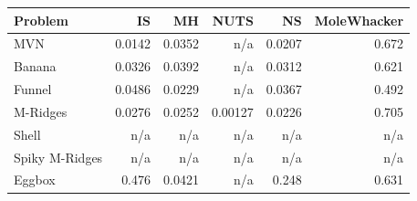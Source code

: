 \begin{tabular}{lrrrrr}
\toprule
Problem & IS & MH & NUTS & NS & MoleWhacker \\
\midrule
MVN & 0.0142 & 0.0352 & n/a & 0.0207 & 0.672 \\
Banana & 0.0326 & 0.0392 & n/a & 0.0312 & 0.621 \\
Funnel & 0.0486 & 0.0229 & n/a & 0.0367 & 0.492 \\
M-Ridges & 0.0276 & 0.0252 & 0.00127 & 0.0226 & 0.705 \\
Shell & n/a & n/a & n/a & n/a & n/a \\
Spiky M-Ridges & n/a & n/a & n/a & n/a & n/a \\
\midrule
Eggbox & 0.476 & 0.0421 & n/a & 0.248 & 0.631 \\
\bottomrule
\end{tabular}

